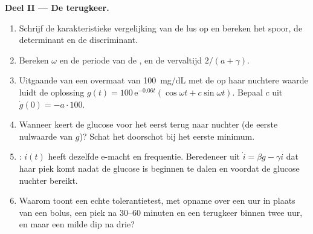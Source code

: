 \begin{problem}
\medskip
\noindent\textbf{Deel II --- De terugkeer.}
\begin{enumerate}[resume]
  \item Schrijf de karakteristieke vergelijking van de lus op en
        bereken het spoor, de determinant en de discriminant.
  \item Bereken $\omega$ en de periode van de , en de
        vervaltijd $2/(a + \gamma)$.
  \item Uitgaande van een overmaat van \qty{100}{mg/dL} met de 
        op haar nuchtere waarde luidt de oplossing $g(t) = 100\,\mathrm{e}^{-0.06t}
        (\cos\omega t + c\sin\omega t)$. Bepaal $c$ uit $\dot g(0) = -a\cdot
        100$.
  \item Wanneer keert de glucose voor het eerst terug naar nuchter (de
        eerste nulwaarde van $g$)? Schat het doorschot bij het eerste minimum.
  \item {}: $i(t)$ heeft dezelfde e-macht en frequentie.
        Beredeneer uit $\dot i = \beta g - \gamma i$ dat haar piek komt
        nadat de glucose is beginnen te dalen en voordat de glucose
        nuchter bereikt.
  \item Waarom toont een echte tolerantietest, met opname over een uur
        in plaats van een bolus, een piek na 30--60 minuten en een
        terugkeer binnen twee uur, en maar een milde dip na drie?
\end{enumerate}


\end{problem}
